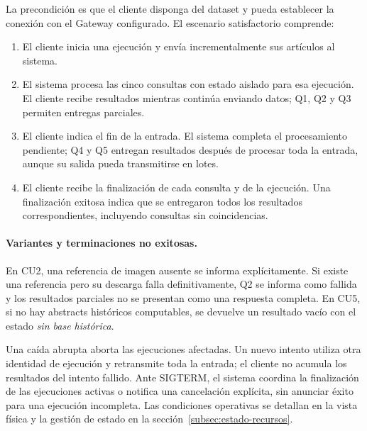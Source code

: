La precondición es que el cliente disponga del dataset y pueda establecer
la conexión con el Gateway configurado. El escenario satisfactorio comprende:
\begin{enumerate}
    \item El cliente inicia una ejecución y envía incrementalmente sus
    artículos al sistema.
    \item El sistema procesa las cinco consultas con estado aislado para esa
    ejecución. El cliente recibe resultados mientras continúa enviando datos;
    Q1, Q2 y Q3 permiten entregas parciales.
    \item El cliente indica el fin de la entrada. El sistema completa el
    procesamiento pendiente; Q4 y Q5 entregan resultados después de procesar
    toda la entrada, aunque su salida pueda transmitirse en lotes.
    \item El cliente recibe la finalización de cada consulta y de la ejecución.
    Una finalización exitosa indica que se entregaron todos los resultados
    correspondientes, incluyendo consultas sin coincidencias.
\end{enumerate}

\paragraph{Variantes y terminaciones no exitosas.}
En CU2, una referencia de imagen ausente se informa explícitamente. Si existe
una referencia pero su descarga falla definitivamente, Q2 se informa como
fallida y los resultados parciales no se presentan como una respuesta completa.
En CU5, si no hay abstracts históricos computables, se devuelve un resultado
vacío con el estado \emph{sin base histórica}.

Una caída abrupta aborta las ejecuciones afectadas. Un nuevo intento utiliza
otra identidad de ejecución y retransmite toda la entrada; el cliente no
acumula los resultados del intento fallido. Ante SIGTERM, el sistema coordina
la finalización de las ejecuciones activas o notifica una cancelación explícita,
sin anunciar éxito para una ejecución incompleta. Las condiciones operativas
se detallan en la vista física y la gestión de estado en la
sección~\ref{subsec:estado-recursos}.

